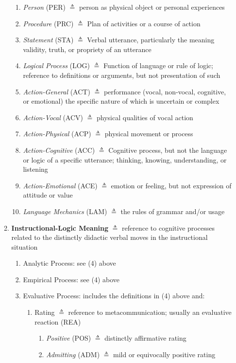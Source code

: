 \documentclass[10pt, letterpaper]{article}
\begin{document}
\begin{itemize}
\begin{enumerate}
\begin{enumerate}
\item \emph{Person} (PER) \(\triangleq\) person as physical object or personal experiences
\item \emph{Procedure} (PRC) \(\triangleq\) Plan of activities or a course of action
\item \emph{Statement} (STA) \(\triangleq\) Verbal utterance, particularly the meaning validity, truth, or propriety of an utterance
\item \emph{Logical Process} (LOG) \(\triangleq\) Function of language or rule of logic; reference to definitions or arguments, but not presentation of such
\item \emph{Action-General} (ACT) \(\triangleq\) performance (vocal, non-vocal, cognitive, or emotional) the specific nature of which is uncertain or complex
\item \emph{Action-Vocal} (ACV) \(\triangleq\) physical qualities of vocal action
\item \emph{Action-Physical} (ACP) \(\triangleq\) physical movement or process
\item \emph{Action-Cognitive} (ACC) \(\triangleq\) Cognitive process, but not the language or logic of a specific utterance; thinking, knowing, understanding, or listening
\item \emph{Action-Emotional} (ACE) \(\triangleq\) emotion or feeling, but not expression of attitude or value
\item \emph{Language Mechanics} (LAM) \(\triangleq\) the rules of grammar and/or usage
\end{enumerate}
\item \textbf{Instructional-Logic Meaning} \(\triangleq\) reference to cognitive processes related to the distinctly didactic verbal moves in the instructional situation
\begin{enumerate}
\item Analytic Process: see (4) above
\item Empirical Process: see (4) above
\item Evaluative Process: includes the definitions in (4) above and:
\begin{enumerate}
\item Rating \(\triangleq\) reference to metacommunication; usually an evaluative reaction (REA)
\begin{enumerate}
\item \emph{Positive} (POS) \(\triangleq\) distinctly affirmative rating
\item \emph{Admitting} (ADM) \(\triangleq\) mild or equivocally positive rating

\end{enumerate}
\end{enumerate}
\end{enumerate}
\end{enumerate}
\end{itemize}
\end{document}
